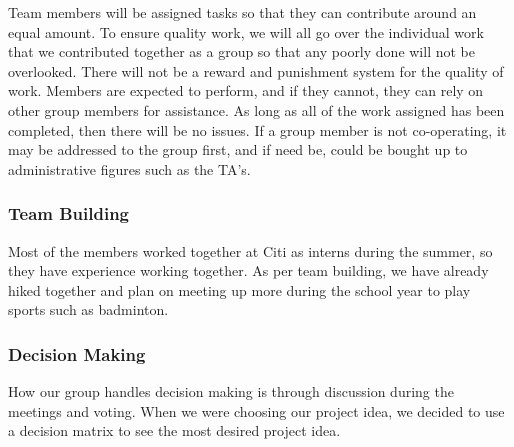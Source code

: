 \documentclass{article}
\begin{document}
Team members will be assigned tasks so that they can contribute around an equal amount. To ensure quality work, we will all go over the individual work that we contributed together as a group so that any poorly done will not be overlooked. There will not be a reward and punishment system for the quality of work. Members are expected to perform, and if they cannot, they can rely on other group members for assistance. As long as all of the work assigned has been completed, then there will be no issues. If a group member is not co-operating, it may be addressed to the group first, and if need be, could be bought up to administrative figures such as the TA’s. 

\subsubsection*{Team Building}

Most of the members worked together at Citi as interns during the summer, so they have experience working together. As per team building, we have already hiked together and plan on meeting up more during the school year to play sports such as badminton. 

\subsubsection*{Decision Making} 

How our group handles decision making is through discussion during the meetings and voting. When we were choosing our project idea, we decided to use a decision matrix to see the most desired project idea. 
\end{document}
